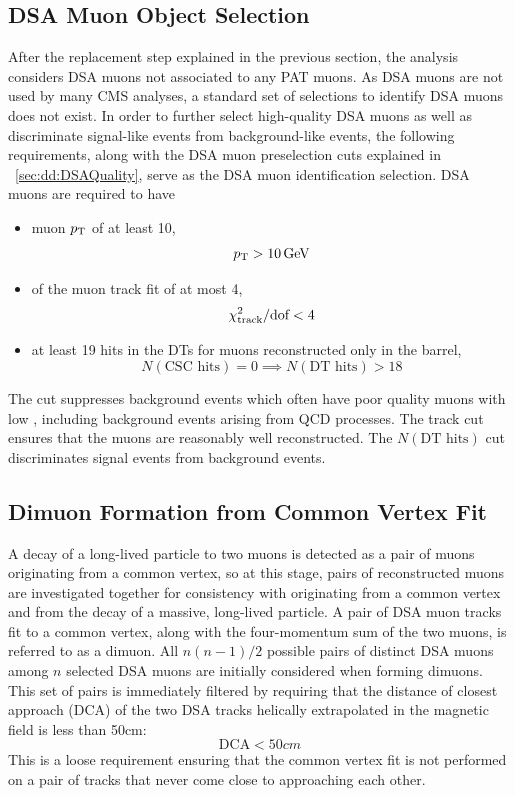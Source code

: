 \subsection{DSA Muon Object Selection}
After the \DSAToPAT replacement step explained in the previous section, the analysis considers DSA muons not associated to any PAT muons.
As DSA muons are not used by many CMS analyses, a standard set of selections to identify DSA muons does not exist.
In order to further select high-quality DSA muons as well as discriminate signal-like events from background-like events, the following requirements, along with the DSA muon preselection cuts explained in \Sec~\ref{sec:dd:DSAQuality}, serve as the DSA muon identification selection.
DSA muons are required to have
\begin{itemize}
  \item muon $p_{\mathrm{T}}$ of at least 10\GeV, \ie $$p_{\mathrm{T}} > 10\,\text{Ge\hspace{-.08em}V}$$
  \item \normchisq of the muon track fit of at most 4, \ie $$\chi^{2}_\text{track}/\text{dof} < 4$$
  \item at least 19 hits in the DTs for muons reconstructed only in the barrel, \ie $$N(\text{CSC hits}) = 0 \implies N(\text{DT hits}) > 18$$
\end{itemize}

The \pT cut suppresses background events which often have poor quality muons with low \pT, including background events arising from QCD processes.
The track \normchisq cut ensures that the muons are reasonably well reconstructed.
The $N(\text{DT hits})$ cut discriminates signal events from background events.

\subsection{Dimuon Formation from Common Vertex Fit}
A decay of a long-lived particle to two muons is detected as a pair of muons originating from a common vertex, so at this stage, pairs of reconstructed muons are investigated together for consistency with originating from a common vertex and from the decay of a massive, long-lived particle.
A pair of DSA muon tracks fit to a common vertex, along with the four-momentum sum of the two muons, is referred to as a dimuon.
All $n(n-1)/2$ possible pairs of distinct DSA muons among $n$ selected DSA muons are initially considered when forming dimuons.
This set of pairs is immediately filtered by requiring that the distance of closest approach (DCA) of the two DSA tracks helically extrapolated in the magnetic field is less than 50\unit{cm}:
$$\text{DCA} < 50\unit{cm}$$
This is a loose requirement ensuring that the common vertex fit is not performed on a pair of tracks that never come close to approaching each other.


